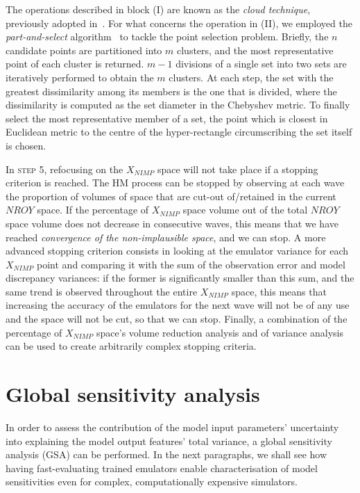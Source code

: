 \noindent
The operations described in block \textsc{(I)} are known as the \textit{cloud technique}, previously adopted in~\cite{Coveney:2018}. For what concerns the operation in \textsc{(II)}, we employed the \textit{part-and-select} algorithm~\cite{Salomon:2013} to tackle the point selection problem. Briefly, the $n$ candidate points are partitioned into $m$ clusters, and the most representative point of each cluster is returned. $m - 1$ divisions of a single set into two sets are iteratively performed to obtain the $m$ clusters. At each step, the set with the greatest dissimilarity among its members is the one that is divided, where the dissimilarity is computed as the set diameter in the Chebyshev metric. To finally select the most representative member of a set, the point which is
closest in Euclidean metric to the centre of the hyper-rectangle circumscribing the set itself is chosen.

\vspace{0.2cm}
In \textsc{step 5}, refocusing on the $X_{NIMP}$ space will not take place if a stopping criterion is reached. The HM process can be stopped by observing at each wave the proportion of volumes of space that are cut-out of/retained in the current $NROY$ space. If the percentage of $X_{NIMP}$ space volume out of the total $NROY$ space volume does not decrease in consecutive waves, this means that we have reached \textit{convergence of the non-implausible space}, and we can stop. A more advanced stopping criterion consists in looking at the emulator variance for each $X_{NIMP}$ point and comparing it with the sum of the observation error and model discrepancy variances: if the former is significantly smaller than this sum, and the same trend is observed throughout the entire $X_{NIMP}$ space, this means that increasing the accuracy of the emulators for the next wave will not be of any use and the space will not be cut, so that we can stop. Finally, a combination of the percentage of $X_{NIMP}$ space's volume reduction analysis and of variance analysis can be used to create arbitrarily complex stopping criteria.


%
%
%
\section{Global sensitivity analysis}\label{sec:ch3globalsensitivityanalysis}
In order to assess the contribution of the model input parameters' uncertainty into explaining the model output features' total variance, a global sensitivity analysis (\acs{GSA}) can be performed. In the next paragraphs, we shall see how having fast-evaluating trained emulators enable characterisation of model sensitivities even for complex, computationally expensive simulators.

